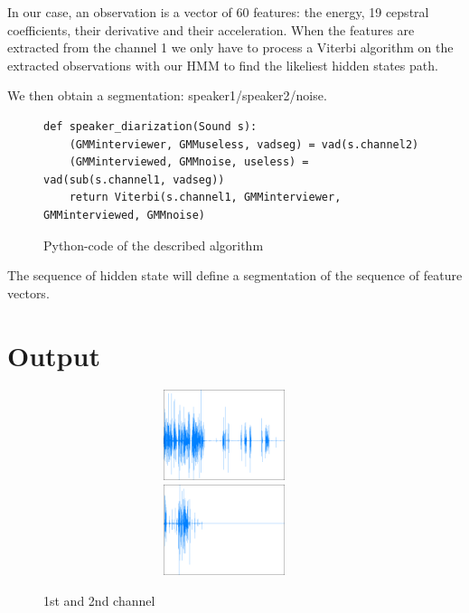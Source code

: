 \documentclass{techrep} %
\begin{document}
In our case, an observation is a vector of 60 features: the energy, 19
cepstral coefficients, their derivative and their acceleration.  When
the features are extracted from the channel 1 we only have to process a
Viterbi algorithm on the extracted observations with our HMM to find
the likeliest hidden states path.

We then obtain a segmentation: speaker1/speaker2/noise.

\begin{figure}[H]
  \begin{lstlisting}[frame=single]
    def speaker_diarization(Sound s):
    (GMMinterviewer, GMMuseless, vadseg) = vad(s.channel2)
    (GMMinterviewed, GMMnoise, useless) = vad(sub(s.channel1, vadseg))
    return Viterbi(s.channel1, GMMinterviewer, GMMinterviewed, GMMnoise)
  \end{lstlisting}
  \caption{Python-code of the described algorithm}
  \label{pseudocodehmmgmm}
\end{figure}

The sequence of hidden state will define a segmentation of the
sequence of feature vectors.

\newpage

\section{Output}

\begin{figure}[H]
  \centering \includegraphics[width=400px,height=100px]{signal_c1}
  \centering \includegraphics[width=400px,height=100px]{signal_c2}
  \caption{1st and 2nd channel}
  \label{sigc1}
\end{figure}
\end{document}
